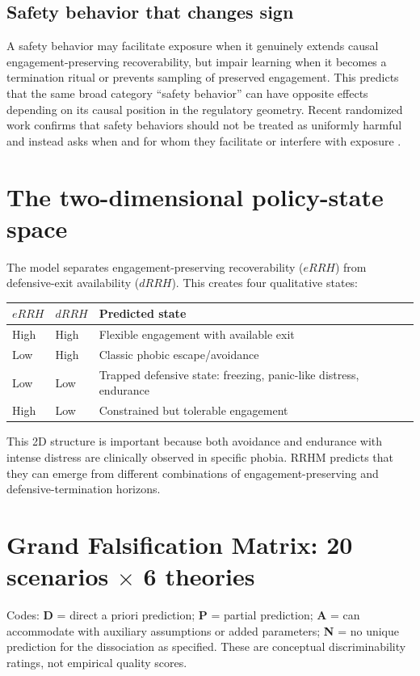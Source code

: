 \documentclass[10pt]{article}
\begin{document}
\subsection{Safety behavior that changes sign}
A safety behavior may facilitate exposure when it genuinely extends causal engagement-preserving recoverability, but impair learning when it becomes a termination ritual or prevents sampling of preserved engagement. This predicts that the same broad category ``safety behavior'' can have opposite effects depending on its causal position in the regulatory geometry. Recent randomized work confirms that safety behaviors should not be treated as uniformly harmful and instead asks when and for whom they facilitate or interfere with exposure \cite{romano2025safety}.

\section{The two-dimensional policy-state space}
The model separates engagement-preserving recoverability ($eRRH$) from defensive-exit availability ($dRRH$). This creates four qualitative states:

\begin{center}
\begin{tabular}{lll}
\toprule
$eRRH$ & $dRRH$ & Predicted state \\
\midrule
High & High & Flexible engagement with available exit \\
Low & High & Classic phobic escape/avoidance \\
Low & Low & Trapped defensive state: freezing, panic-like distress, endurance \\
High & Low & Constrained but tolerable engagement \\
\bottomrule
\end{tabular}
\end{center}

This 2D structure is important because both avoidance and endurance with intense distress are clinically observed in specific phobia. RRHM predicts that they can emerge from different combinations of engagement-preserving and defensive-termination horizons.

\section{Grand Falsification Matrix: 20 scenarios $\times$ 6 theories}
Codes: \textbf{D} = direct a priori prediction; \textbf{P} = partial prediction; \textbf{A} = can accommodate with auxiliary assumptions or added parameters; \textbf{N} = no unique prediction for the dissociation as specified. These are conceptual discriminability ratings, not empirical quality scores.
\end{document}
